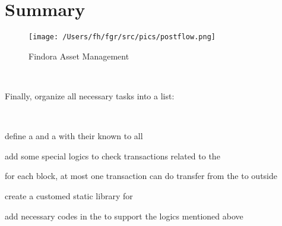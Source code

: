 \clearpage

\section{Summary}

\begin{figure}[htbp]
    \centering
    \texttt{[image: /Users/fh/fgr/src/pics/postflow.png]}
    \caption{Findora Asset Management}
\end{figure}

~\par

Finally, organize all necessary tasks into a list:

~\par

\begin{ENUMERATE}
\item define a  and a  with their  known to all
    \item add some special logics to check transactions related to the 
    \item for each block, at most one transaction can do transfer from the  to outside
    \item create a customed  static library for 
    \item add necessary codes in the  to support the logics mentioned above
\end{ENUMERATE}